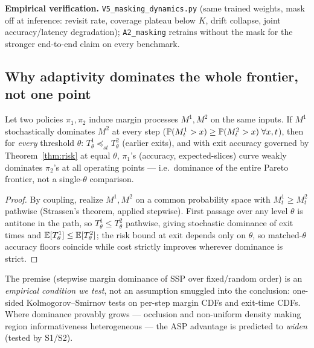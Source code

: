 \noindent\textbf{Empirical verification.} \texttt{V5\_masking\_dynamics.py}
(same trained weights, mask off at inference: revisit rate, coverage
plateau below $K$, drift collapse, joint accuracy/latency degradation);
\texttt{A2\_masking} retrains without the mask for the stronger end-to-end
claim on every benchmark.

\subsection{Why adaptivity dominates the whole frontier, not one point}

\begin{theorem}\label{thm:pareto}
Let two policies $\pi_1,\pi_2$ induce margin processes $M^{1},M^{2}$ on the
same inputs. If $M^{1}$ stochastically dominates $M^{2}$ at every step
($\mathbb{P}(M^1_t>x)\ge\mathbb{P}(M^2_t>x)\;\forall x,t$), then for \emph{every}
threshold $\theta$: $T^1_\theta\preceq_{st}T^2_\theta$ (earlier exits), and
with exit accuracy governed by Theorem~\ref{thm:risk} at equal $\theta$,
$\pi_1$'s (accuracy, expected-slices) curve weakly dominates $\pi_2$'s at
all operating points --- i.e.\ dominance of the entire Pareto frontier, not
a single-$\theta$ comparison.
\end{theorem}
\begin{proof}
By coupling, realize $M^1,M^2$ on a common probability space with
$M^1_t\ge M^2_t$ pathwise (Strassen's theorem, applied stepwise). First
passage over any level $\theta$ is antitone in the path, so
$T^1_\theta\le T^2_\theta$ pathwise, giving stochastic dominance of exit
times and $\mathbb{E}[T^1_\theta]\le\mathbb{E}[T^2_\theta]$; the risk bound at exit depends
only on $\theta$, so matched-$\theta$ accuracy floors coincide while cost
strictly improves wherever dominance is strict.
\end{proof}

\begin{remark}
The premise (stepwise margin dominance of SSP over fixed/random order) is
an \emph{empirical condition we test}, not an assumption smuggled into the
conclusion: one-sided Kolmogorov--Smirnov tests on per-step margin CDFs and
exit-time CDFs. Where dominance provably grows --- occlusion and non-uniform
density making region informativeness heterogeneous --- the ASP advantage is
predicted to \emph{widen} (tested by S1/S2).
\end{remark}

